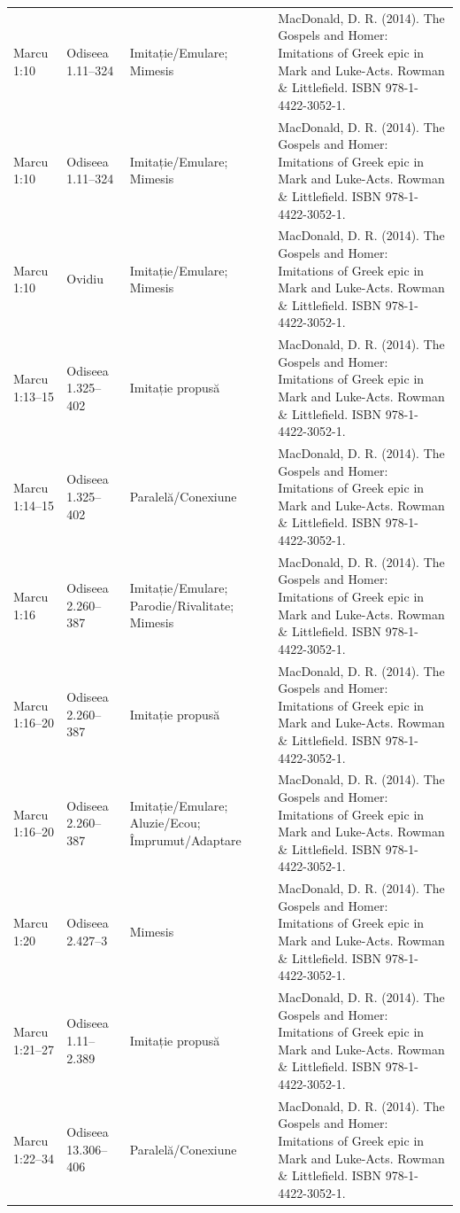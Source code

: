 \documentclass[12pt,a4paper,twoside,openany]{book}
\begin{document}
\begin{longtable}{L{1.4cm}L{1.7cm}L{3.1cm}L{8.4cm}}
Marcu 1:10 & Odiseea 1.11–324 & Imitație/Emulare; Mimesis & MacDonald, D. R. (2014). The Gospels and Homer: Imitations of Greek epic in Mark and Luke-Acts. Rowman \& Littlefield. ISBN 978-1-4422-3052-1. \\
Marcu 1:10 & Odiseea 1.11–324 & Imitație/Emulare; Mimesis & MacDonald, D. R. (2014). The Gospels and Homer: Imitations of Greek epic in Mark and Luke-Acts. Rowman \& Littlefield. ISBN 978-1-4422-3052-1. \\
Marcu 1:10 & Ovidiu & Imitație/Emulare; Mimesis & MacDonald, D. R. (2014). The Gospels and Homer: Imitations of Greek epic in Mark and Luke-Acts. Rowman \& Littlefield. ISBN 978-1-4422-3052-1. \\
Marcu 1:13–15 & Odiseea 1.325–402 & Imitație propusă & MacDonald, D. R. (2014). The Gospels and Homer: Imitations of Greek epic in Mark and Luke-Acts. Rowman \& Littlefield. ISBN 978-1-4422-3052-1. \\
Marcu 1:14–15 & Odiseea 1.325–402 & Paralelă/Conexiune & MacDonald, D. R. (2014). The Gospels and Homer: Imitations of Greek epic in Mark and Luke-Acts. Rowman \& Littlefield. ISBN 978-1-4422-3052-1. \\
Marcu 1:16 & Odiseea 2.260–387 & Imitație/Emulare; Parodie/Rivalitate; Mimesis & MacDonald, D. R. (2014). The Gospels and Homer: Imitations of Greek epic in Mark and Luke-Acts. Rowman \& Littlefield. ISBN 978-1-4422-3052-1. \\
Marcu 1:16–20 & Odiseea 2.260–387 & Imitație propusă & MacDonald, D. R. (2014). The Gospels and Homer: Imitations of Greek epic in Mark and Luke-Acts. Rowman \& Littlefield. ISBN 978-1-4422-3052-1. \\
Marcu 1:16–20 & Odiseea 2.260–387 & Imitație/Emulare; Aluzie/Ecou; Împrumut/Adaptare & MacDonald, D. R. (2014). The Gospels and Homer: Imitations of Greek epic in Mark and Luke-Acts. Rowman \& Littlefield. ISBN 978-1-4422-3052-1. \\
Marcu 1:20 & Odiseea 2.427–3 & Mimesis & MacDonald, D. R. (2014). The Gospels and Homer: Imitations of Greek epic in Mark and Luke-Acts. Rowman \& Littlefield. ISBN 978-1-4422-3052-1. \\
Marcu 1:21–27 & Odiseea 1.11–2.389 & Imitație propusă & MacDonald, D. R. (2014). The Gospels and Homer: Imitations of Greek epic in Mark and Luke-Acts. Rowman \& Littlefield. ISBN 978-1-4422-3052-1. \\
Marcu 1:22–34 & Odiseea 13.306–406 & Paralelă/Conexiune & MacDonald, D. R. (2014). The Gospels and Homer: Imitations of Greek epic in Mark and Luke-Acts. Rowman \& Littlefield. ISBN 978-1-4422-3052-1. \\

\end{longtable}
\end{document}
